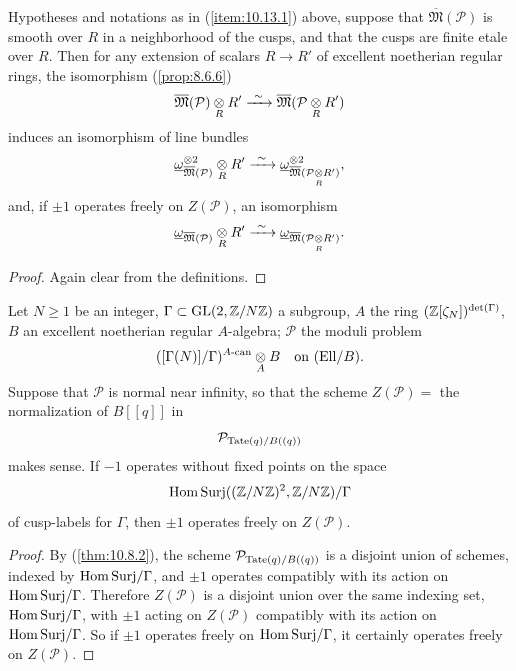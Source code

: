 \begin{kprop}\label{prop:10.13.6}
Hypotheses and notations as in (\ref{item:10.13.1}) above, suppose that $\overline{\mathfrak{M}}(\mathcal{P})$ is smooth over $R$ in a neighborhood of the cusps, and that the cusps are finite etale over $R$. Then for any extension of scalars $R \to R'$ of excellent noetherian regular rings, the isomorphism (\ref{prop:8.6.6})
\[
\overline{\mathfrak{M}}(\mathcal{P}) \underset{R}{\otimes} R' \xrightarrow{\ \sim\ } \overline{\mathfrak{M}}(\mathcal{P} \underset{R}{\otimes} R')
\]
induces an isomorphism of line bundles
\[
\underline{\omega}^{\otimes 2}_{\overline{\mathfrak{M}}(\mathcal{P})} \tens{R} R' \xrightarrow{\ \sim\ } \underline{\omega}^{\otimes 2}_{\overline{\mathfrak{M}}(\mathcal{P} \tens{R} R')} ,
\]
and, if $\pm 1$ operates freely on $Z(\mathcal{P})$, an isomorphism
\[
\underline{\omega}_{\overline{\mathfrak{M}}(\mathcal{P})} \underset{R}{\otimes} R' \xrightarrow{\ \sim\ } \underline{\omega}_{\overline{\mathfrak{M}}(\mathcal{P} \underset{R}{\otimes} R')} .
\]
\end{kprop}

\begin{proof}
Again clear from the definitions.
\end{proof}

\begin{kprop}\label{prop:10.13.7}
Let $N \ge 1$ be an integer, $\Gamma \subset \operatorname{GL}(2, \allowbreak\mathbb{Z}/N\mathbb{Z})$ a subgroup, $A$ the ring $(\mathbb{Z}[\zeta_N])^{\det(\Gamma)}$, $B$ an excellent noetherian regular $A$-algebra; $\mathcal{P}$ the moduli problem
\[
([\Gamma(N)]/\Gamma)^{A\text{\rm-can}} \underset{A}{\otimes} B \quad\text{on } (\mathrm{Ell}/B) .
\]
Suppose that $\mathcal{P}$ is normal near infinity, so that the scheme $Z(\mathcal{P}) =$ the normalization of $B[[q]]$ in
\[
\mathcal{P}_{\mathrm{Tate}(q)/B((q))}
\]
makes sense. If $-1$ operates without fixed points on the space
\[
\mathrm{Hom\,Surj}((\mathbb{Z}/N\mathbb{Z})^2, \mathbb{Z}/N\mathbb{Z})/\Gamma
\]
of cusp-labels for $\Gamma$, then $\pm 1$ operates freely on $Z(\mathcal{P})$.
\end{kprop}

\begin{proof}
By (\ref{thm:10.8.2}), the scheme $\mathcal{P}_{\mathrm{Tate}(q)/B((q))}$ is a disjoint union of schemes, indexed by $\mathrm{Hom\,Surj}/\Gamma$, and $\pm 1$ operates compatibly with its action on $\mathrm{Hom\,Surj}/\Gamma$. Therefore $Z(\mathcal{P})$ is a disjoint union over the same indexing set, $\mathrm{Hom\,Surj}/\Gamma$, with $\pm 1$ acting on $Z(\mathcal{P})$ compatibly with its action on $\mathrm{Hom\,Surj}/\Gamma$. So if $\pm 1$ operates freely on $\mathrm{Hom\,Surj}/\Gamma$, it certainly operates freely on $Z(\mathcal{P})$.
\end{proof}

